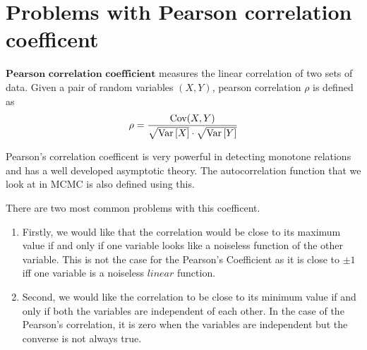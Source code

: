 \chapter{Problems with Pearson correlation coefficent}
\begin{definition}
	$\textbf{Pearson correlation coefficient}$ measures the linear correlation of two sets of data.
	Given a pair of random variables $(X, Y)$, pearson correlation $\rho$ is defined as
	$$\rho = \frac{\text{Cov}(X, Y)}{\sqrt{\text{Var}\left[{{X}}\right]} \cdot \sqrt{\text{Var}\left[{{Y}}\right]}}$$
\end{definition}

Pearson's correlation coefficent is very powerful in detecting monotone relations and
has a well developed asymptotic theory. The autocorrelation function that we look at in MCMC is also defined using this.
\newline

There are two most common problems with this coefficent.
\begin{enumerate}
	\item Firstly, we would like that the correlation would be close to its maximum value
	if and only if one variable looks like a noiseless function of the other variable.
	This is not the case for the Pearson's Coefficient as it is close to $\pm 1$ iff one variable is a noiseless $\textit{linear}$ function.
	\item Second, we would like the correlation to be close to its minimum value if and only if both the variables are independent of each other.
	In the case of the Pearson's correlation, it is zero when the variables are independent but the converse is not always true.
\end{enumerate}
